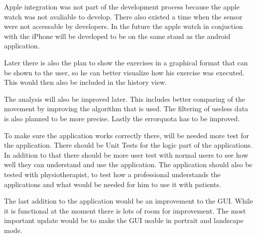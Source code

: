 Apple integration was not part of the development process because the apple watch was not avaliable to develop. There also existed a time when the sensor were not accessable by developers. In the future the apple watch in conjuction with the iPhone will be developed to be on the same stand as the android application.

Later there is also the plan to show the exercises in a graphical format that can be shown to the user, so he can better visualize how his exercise was executed. This would then also be included in the history view.

The analysis will also be improved later. This includes better comparing of the movement by improving the algorithm that is used. The filtering of useless data is also planned to be more precise. Lastly the errorquota has to be improved.

To make sure the application works correctly there, will be needed more test for the application. There should be  Unit Tests for the logic part of the applications. In addition to that there should be more user test with normal users to see how well they can understand and use the application. The application should also be tested with physiotherapist, to test how a professional understands the applications and what would be needed for him to use it with patients.

The last addition to the application would be an improvement to the GUI. While it is functional at the moment there is lots of room for improvement. The most important update would be to make the GUI usable in portrait and landscape mode.

